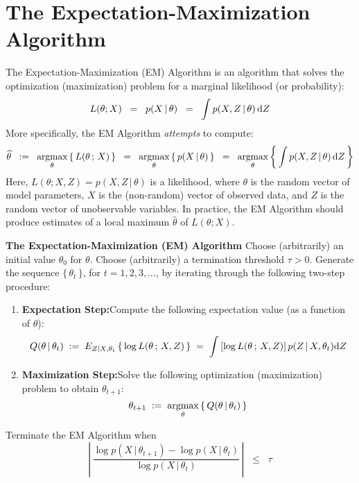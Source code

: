 \section{The Expectation-Maximization Algorithm}
\setcounter{theorem}{0}
\setcounter{equation}{0}


The Expectation-Maximization (EM) Algorithm is an algorithm that solves the optimization
(maximization) problem for a marginal likelihood (or probability):
\begin{equation*}
L(\theta;X) \;\; = \;\; p(X\,|\,\theta) \;\; = \;\; \int p(X,Z\,|\,\theta) \,\textnormal{d}Z
\end{equation*}
More specifically, the EM Algorithm \textit{attempts} to compute:
\begin{equation*}
\widehat{\theta}
\;\; := \;\;
\underset{\theta}{\textnormal{argmax}}\left\{\,L(\theta\,;\,X)\,\right\}
\;\; = \;\;
\underset{\theta}{\textnormal{argmax}}\left\{\,p(X\,|\,\theta)\,\right\}
\;\; = \;\;
\underset{\theta}{\textnormal{argmax}}\left\{\,\int p(X,Z\,|\,\theta) \,\textnormal{d}Z\,\right\}
\end{equation*}
Here, $L(\theta;X,Z) = p(X,Z\,|\,\theta)$ is a likelihood, where $\theta$ is the random vector of model
parameters, $X$ is the (non-random) vector of observed data, and $Z$ is the random vector of
unobservable variables.
In practice, the EM Algorithm should produce estimates of a local maximum $\widehat{\theta}$ of $L(\theta;X)$.

\vskip 1.0cm
\noindent
\textbf{The Expectation-Maximization (EM) Algorithm}
\vskip 0.3cm
\noindent
Choose (arbitrarily) an initial value $\theta_{0}$ for $\theta$.
Choose (arbitrarily) a termination threshold $\tau > 0$.
Generate the sequence $\{\,\theta_{t}\,\}$, for $t = 1, 2, 3, \ldots$, by iterating through the following
two-step procedure:
\begin{enumerate}
\item	\textbf{Expectation Step:}\quad Compute the following expectation value (as a function of $\theta$):
		\begin{equation}
		\label{EM:ExpectationStep}
		Q(\theta\,|\,\theta_{t})
		\; := \;
		E_{Z|X,\theta_{t}}\left\{\,\log L(\theta\,;\,X,Z)\,\right\}
		\; = \;
		\int \left[\log L(\theta\,;\,X,Z)\right] p(Z\,|\,X,\theta_{t}) \textnormal{d}Z
		\end{equation}
\item	\textbf{Maximization Step:}\quad Solve the following optimization (maximization) problem to obtain
		$\theta_{t+1}$:
		\begin{equation}
		\label{EM:MaximizationStep}
		\theta_{t+1} \; := \;
		\underset{\theta}{\textnormal{argmax}}\left\{\,Q(\theta\,|\,\theta_{t})\,\right\}
		\end{equation}
\end{enumerate}
Terminate the EM Algorithm when
\begin{equation}
\label{EM:terminationCriterion}
\left\vert\,\dfrac{\log p(X\,|\,\theta_{t+1})-\log p(X\,|\,\theta_{t})}{\log p(X\,|\,\theta_{t})}\,\right\vert
\;\; \leq \;\; \tau
\end{equation}
\vskip 1.0cm


